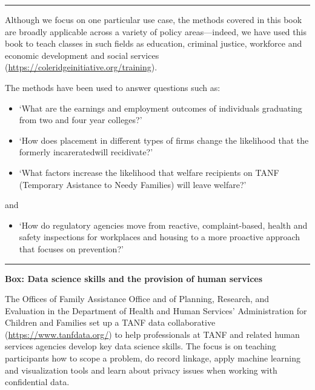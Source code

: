 \documentclass[]{krantz}
\providecommand{\tightlist}{%
  \setlength{\itemsep}{0pt}\setlength{\parskip}{0pt}}
\begin{document}
\begin{center}\rule{0.5\linewidth}{\linethickness}\end{center}

Although we focus on one particular use case, the methods covered in
this book are broadly applicable across a variety of policy
areas---indeed, we have used this book to teach classes in such fields
as education, criminal justice, workforce and economic development and
social services (\url{https://coleridgeinitiative.org/training}).

The methods have been used to answer questions such as:

\begin{itemize}
\item
  `What are the earnings and employment outcomes of individuals
  graduating from two and four year colleges?'
\item
  `How does placement in different types of firms change the likelihood
  that the formerly incareratedwill recidivate?'
\item
  `What factors increase the likelihood that welfare recipients on TANF
  (Temporary Asistance to Needy Families) will leave welfare?'
\end{itemize}

and

\begin{itemize}
\tightlist
\item
  `How do regulatory agencies move from reactive, complaint-based,
  health and safety inspections for workplaces and housing to a more
  proactive approach that focuses on prevention?'
\end{itemize}

\begin{center}\rule{0.5\linewidth}{\linethickness}\end{center}

\textbf{Box: Data science skills and the provision of human services}

The Offices of Family Assistance Office and of Planning, Research, and
Evaluation in the Department of Health and Human Services'
Administration for Children and Families set up a TANF data
collaborative (\url{https://www.tanfdata.org/}) to help professionals at
TANF and related human services agencies develop key data science
skills. The focus is on teaching participants how to scope a problem, do
record linkage, apply machine learning and visualization tools and learn
about privacy issues when working with confidential data.
\end{document}
